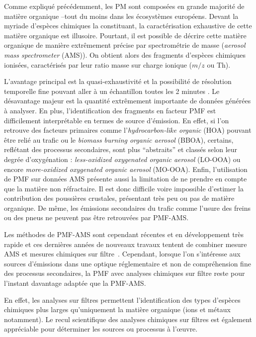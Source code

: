 Comme expliqué précédemment, les PM sont composées en grande majorité de matière organique
--tout du moins dans les écosystèmes européens.  Devant la myriade d'espèces chimiques la
constituant, la caractérisation exhaustive de cette matière organique est illusoire.
Pourtant, il est possible de décrire cette matière organique de manière extrêmement
précise par spectrométrie de masse (\textit{aerosol mass spectrometer} (AMS)). On obtient alors des
fragments d'espèces chimiques ionisées, caractérisés par leur ratio masse sur charge ionique
($m/z$ ou Th).

L'avantage principal est la quasi-exhaustivité et la possibilité de
résolution temporelle fine pouvant aller à un échantillon toutes les 2 minutes
\autocite{marmureanuOnline2020}.  Le désavantage majeur est la quantité extrêmement
importante de données générées à analyser. En plus, l'identification des fragments en
facteur PMF est difficilement interprétable en termes de source d'émission. En effet, si
l'on retrouve des facteurs primaires comme l'\textit{hydrocarbon-like organic} (HOA)
pouvant être relié au trafic ou le \textit{biomass burning organic aerosol} (BBOA),
certains, reflétant des processus secondaires, sont plus ``abstraits'' et classés selon leur
degrée d'oxygénation : \textit{less-oxidized oxygenated organic aerosol} (LO-OOA) ou
encore \textit{more-oxidized oxygenated organic aerosol} (MO-OOA).
Enfin, l'utilisation de PMF sur données AMS présente aussi la limitation de ne prendre en
compte que la matière non réfractaire. Il est donc difficile voire impossible d'estimer la
contribution des poussières crustales, présentant très peu ou pas de matière organique. De
même, les émissions secondaires du trafic comme l'usure des freins ou des pneus ne peuvent
pas être retrouvées par PMF-AMS.

Les méthodes de PMF-AMS sont cependant récentes et en développement très rapide et ces
dernières années de nouveaux travaux tentent de combiner mesure AMS et mesures chimiques sur
filtre~\autocite{vlachouAdvanced2018,vlachouDevelopment2019}.  Cependant, lorsque l'on
s'intéresse aux sources d'émissions dans une optique réglementaire et non de compréhension
fine des processus secondaires, la PMF avec analyses chimiques sur filtre reste pour
l'instant davantage adaptée que la PMF-AMS.

En effet, les analyses sur filtres permettent l'identification des types d'espèces
chimiques plus larges qu'uniquement la matière organique (ions et métaux notamment).  Le
recul scientifique des analyses chimiques sur filtres est également appréciable pour
déterminer les sources ou processus à l'œuvre.

